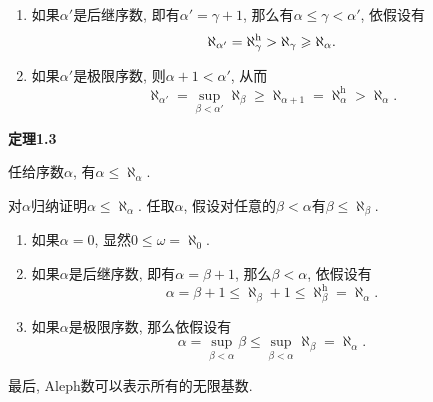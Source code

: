 \documentclass[UTF8]{ctexart}
\begin{document}
\begin{enumerate}
    \item 如果$\alpha'$是后继序数, 即有$\alpha'=\gamma+1$,
    那么有$\alpha\leqslant\gamma<\alpha'$, 依假设有
    \vspace{1pt}
    \[
        \aleph_{\alpha'}=\aleph_\gamma^{\mathrm{h}}>
        \aleph_\gamma\geqslant\aleph_\alpha.\\[3pt]
    \]
    \item 如果$\alpha'$是极限序数, 则$\alpha+1<\alpha'$, 从而
    \vspace{1pt}
    \begin{equation*}
        \aleph_{\alpha'}=\sup_{\beta<\alpha'}\aleph_\beta
        \geqslant\aleph_{\alpha+1}=\aleph_\alpha^{\mathrm{h}}>\aleph_\alpha.
    \tag*{\qedsymbol}\end{equation*}
\end{enumerate}

\vspace{10pt}

\hypertarget{sec:定理1.3}{}
\noindent\textbf{定理1.3}

任给序数$\alpha$, 有$\alpha\leqslant\aleph_\alpha$.


对$\alpha$归纳证明$\alpha\leqslant\aleph_\alpha$. 任取$\alpha$,
假设对任意的$\beta<\alpha$有$\beta\leqslant\aleph_\beta$.

\begin{enumerate}
    \item 如果$\alpha=0$, 显然$0\leqslant\omega=\aleph_0$.
    \item 如果$\alpha$是后继序数, 即有$\alpha=\beta+1$,
    那么$\beta<\alpha$, 依假设有
    \[
        \alpha=\beta+1\leqslant\aleph_\beta+1\leqslant
        \aleph_\beta^{\mathrm{h}}=\aleph_\alpha.
    \]
    \item 如果$\alpha$是极限序数, 那么依假设有
    \begin{equation*}
        \alpha=\sup_{\beta<\alpha}\beta\leqslant
        \sup_{\beta<\alpha}\aleph_\beta=\aleph_\alpha.
    \tag*{\qedsymbol}\end{equation*}
\end{enumerate}





\newpage

最后, Aleph数可以表示所有的无限基数.

\vspace{10pt}
\end{document}
